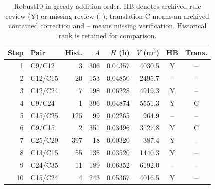 \begin{table}[tbp]\caption{Robust10 in greedy addition order. HB denotes archived rule review (Y) or missing review (--); translation C means an archived contained correction and -- means missing verification. Historical rank is retained for comparison.}\label{tab:robust}\centering
\small
\begin{tabular}{rlrrrrcc}\toprule
Step & Pair & Hist. & $A$ & $H$ (h) & $V$ (m$^3$) & HB & Trans.\\\midrule
1 & C9/C12 & 3 & 306 & 0.04357 & 4030.5 & Y & --\\
2 & C12/C15 & 20 & 153 & 0.04850 & 2495.7 & -- & --\\
3 & C12/C24 & 7 & 198 & 0.06228 & 4919.3 & Y & --\\
4 & C9/C24 & 1 & 396 & 0.04874 & 5551.3 & Y & C\\
5 & C15/C25 & 125 & 99 & 0.02265 & 964.9 & -- & --\\
6 & C9/C15 & 2 & 351 & 0.03496 & 3127.8 & Y & C\\
7 & C25/C29 & 397 & 18 & 0.00320 & 387.4 & Y & --\\
8 & C13/C15 & 55 & 135 & 0.03520 & 1440.3 & Y & --\\
9 & C24/C35 & 11 & 189 & 0.06352 & 6192.0 & -- & --\\
10 & C15/C24 & 4 & 243 & 0.05367 & 4016.5 & Y & --\\
\bottomrule\end{tabular}

\end{table}

